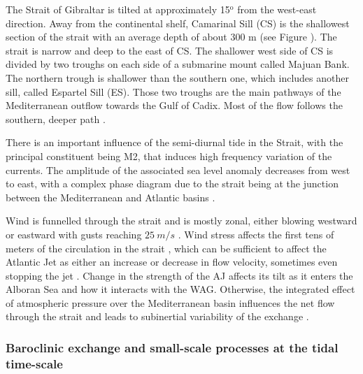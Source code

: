 The Strait of Gibraltar is tilted at approximately 15$^\text{o}$ from the west-east direction. Away from the continental shelf, Camarinal Sill (CS) is the shallowest section of the strait with an average depth of about 300 m (see Figure ). The strait is narrow and deep to the east of CS. The shallower west side of CS is divided by two troughs on each side of a submarine mount called Majuan Bank. The northern trough is shallower than the southern one, which includes another sill, called Espartel Sill (ES). Those two troughs are the main pathways of the Mediterranean outflow towards the Gulf of Cadix. Most of the flow follows the southern, deeper path \citep{sanchez-roman_2009}.

\color{red}There is an important influence of the semi-diurnal tide in the Strait, with the principal constituent being M2, that induces high frequency variation of the currents. The amplitude of the associated sea level anomaly decreases from west to east, with a complex phase diagram due to the strait being at the junction between the Mediterranean and Atlantic basins \citep{garcialafuente_1990,CW90}.\color{black}

Wind is funnelled through the strait and is mostly zonal, either blowing westward or eastward with gusts reaching $25\ m/s$ \citep{candela_1989}. Wind stress affects the first tens of meters of the circulation in the strait \citep{candela_1989}, which can be sufficient to affect the Atlantic Jet as either an increase or decrease in flow velocity, %
sometimes even stopping the jet \citep{garcialafuente_2002c}. Change in the strength of the AJ affects its tilt as it enters the Alboran Sea and how it interacts with the WAG. Otherwise, the integrated effect of atmospheric pressure over the Mediterranean basin influences the net flow through the strait and leads to subinertial variability of the exchange \citep{garcialafuente_2002}.

\subsubsection{Baroclinic exchange and small-scale processes at the tidal time-scale}

